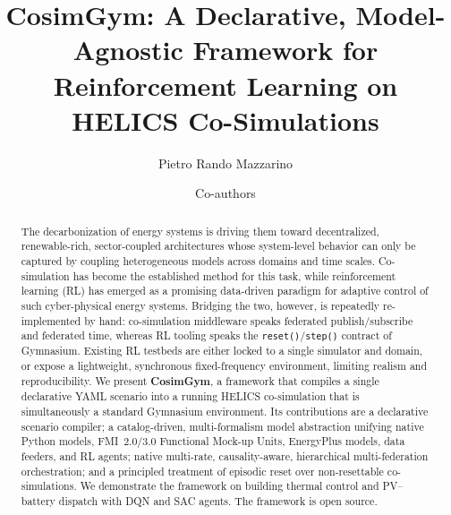 \documentclass[preprint,12pt]{elsarticle}
\begin{document}
\begin{frontmatter}

\title{CosimGym: A Declarative, Model-Agnostic Framework for\\
Reinforcement Learning on HELICS Co-Simulations}

\author[polito]{Pietro Rando Mazzarino}
\author[polito]{Co-authors}
\address[polito]{EC-Lab, Politecnico di Torino, Turin, Italy}

\begin{abstract}
The decarbonization of energy systems is driving them toward decentralized,
renewable-rich, sector-coupled architectures whose system-level behavior can only
be captured by coupling heterogeneous models across domains and time scales.
Co-simulation has become the established method for this task, while reinforcement
learning (RL) has emerged as a promising data-driven paradigm for adaptive control
of such cyber-physical energy systems. Bridging the two, however, is repeatedly
re-implemented by hand: co-simulation middleware speaks federated
publish/subscribe and federated time, whereas RL tooling speaks the
\texttt{reset()}/\texttt{step()} contract of Gymnasium. Existing RL testbeds are
either locked to a single simulator and domain, or expose a lightweight,
synchronous fixed-frequency environment, limiting realism and reproducibility. We
present \textbf{CosimGym}, a framework that compiles a single declarative YAML
scenario into a running HELICS co-simulation that is simultaneously a standard
Gymnasium environment. Its contributions are a declarative scenario compiler; a
catalog-driven, multi-formalism model abstraction unifying native Python models,
FMI~2.0/3.0 Functional Mock-up Units, EnergyPlus models, data feeders, and RL
agents; native multi-rate, causality-aware, hierarchical multi-federation
orchestration; and a principled treatment of episodic reset over non-resettable
co-simulations. We demonstrate the framework on building thermal control and
PV--battery dispatch with DQN and SAC agents.
The framework is open source. %
\end{abstract}



\end{frontmatter}
\end{document}
